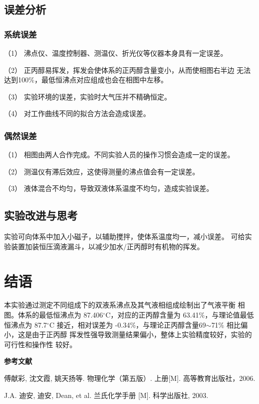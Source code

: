 \documentclass[12pt]{ctexart}
\numberwithin{equation}{section}
\begin{document}
\subsection{误差分析}
\subsubsection{系统误差}
（1） 沸点仪、温度控制器、测温仪、折光仪等仪器本身具有一定误差。

（2） 正丙醇易挥发，挥发会使体系的正丙醇含量变小，从而使相图右半边
无法达到100\%，最低恒沸点对应组成也会在相图中左移。

（3） 实验环境的误差，实验时大气压并不精确恒定。

（4） 对工作曲线不同的拟合方法会造成误差。

\subsubsection{偶然误差}
（1） 相图由两人合作完成。不同实验人员的操作习惯会造成一定的误差。

（2） 测温仪有滞后效应，这使得测量的沸点值会有一定误差。

（3） 液体混合不均匀，导致双液体系温度不均匀，造成实验误差。

\subsection{实验改进与思考}
实验可向体系中加入小磁子，以辅助搅拌，使体系温度均一，减小误差。
可给实验装置加装恒压滴液漏斗，以减少加水/正丙醇时有机物的挥发。

\section{结语}
本实验通过测定不同组成下的双液系沸点及其气液相组成绘制出了气液平衡
相图。体系的最低恒沸点为 87.406$^\circ$C，对应的正丙醇含量为
63.41\%，与理论值最低恒沸点为 87.7$^\circ$C 接近，相对误差为
-0.34\%，与理论正丙醇含量69$\sim$71\% 相比偏小，这是由于正丙醇
挥发性强导致测量结果偏小，整体上实验精度较好，实验的可行性和操作性
较好。

\begin{center}
    \Large\bfseries{参考文献}
\end{center}
\noindent
[1] 傅献彩, 沈文霞, 姚天扬等. 物理化学（第五版）. 上册[M].
高等教育出版社，2006.

\noindent
[2] J.A. 迪安, 迪安, Dean, et al. 兰氏化学手册 [M]. 科学出版社,
2003.

\newpage
\end{document}
